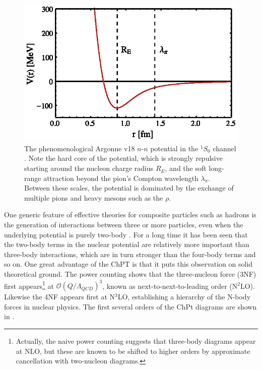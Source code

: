 \begin{figure}
\centering
\includegraphics[scale=1.0]{Introduction/Figures/OneSZero}
\caption[Separation of scales in the two-nucleon potential]{\label{fig:NuclearPotential} The phenomenological Argonne v18 $n$-$n$ potential in the $^1S_0$ channel \cite{PhysRevC.51.38}. Note the hard core of the potential, which is strongly repulsive starting around the nucleon charge radius $R_E$, and the soft long-range attraction beyond the pion's Compton wavelength $\lambda_\pi$. Between these scales, the potential is dominated by the exchange of multiple pions and heavy mesons such as the $\rho$.  } 
\end{figure}

One generic feature of effective theories for composite particles such as hadrons is the generation of interactions between three or more particles, even when the underlying potential is purely two-body \cite{RevModPhys.85.197}. For a long time it has been seen that the two-body terms in the nuclear potential are relatively more important than three-body interactions, which are in turn stronger than the four-body terms and so on. One great advantage of the ChPT is that it puts this observation on solid theoretical ground. The power counting shows that the three-nucleon force (3NF) first appears\footnote{Actually, the naive power counting suggests that three-body diagrams appear at NLO, but these are known to be shifted to higher orders by approximate cancellation with two-nucleon diagrams\cite{PhysRevC.49.2932}.} at $\mathcal{O}(Q/\Lambda_{QCD})^3$, known as next-to-next-to-leading order (N$^2$LO). Likewise the 4NF appears first at N$^3$LO, establishing a hierarchy of the N-body forces in nuclear physics. The first several orders of the ChPt diagrams are shown in .

